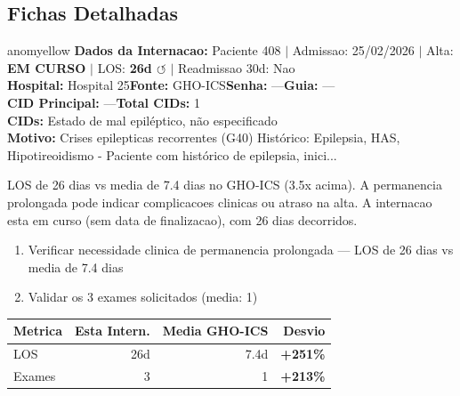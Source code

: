 \documentclass[a4paper,10pt]{article}
\begin{document}
\subsection{Fichas Detalhadas}
\begin{anomalycard}[Internacao 342 | GHO-ICS | MODERADO (z=2.78)]{anomyellow}
\textbf{Dados da Internacao:} Paciente 408 $\mid$ Admissao: 25/02/2026 $\mid$ Alta: \textcolor{anomorange}{\textbf{EM CURSO}} $\mid$ LOS: \textbf{26d \textcolor{anomorange}{$\circlearrowleft$}} $\mid$ Readmissao 30d: Nao\\
\textbf{Hospital:} Hospital 25\quad\textbf{Fonte:} GHO-ICS\quad\textbf{Senha:} ---\quad\textbf{Guia:} ---\\
\textbf{CID Principal:} {\small ---}\quad\textbf{Total CIDs:} 1\\

\textbf{CIDs:} {\scriptsize Estado de mal epiléptico, não especificado}\\

\textbf{Motivo:} {\scriptsize Crises epilepticas recorrentes (G40)  Histórico: Epilepsia, HAS, Hipotireoidismo  - Paciente com histórico de epilepsia, inici...}\\

\vspace{2pt}\begin{tcolorbox}[colback=severityred!20,colframe=anomyellow,title={\textbf{Interpretacao de Negocio}},fonttitle=\bfseries\small,left=4pt,right=4pt,top=3pt,bottom=3pt]
{\small LOS de 26 dias vs media de 7.4 dias no GHO-ICS (3.5x acima). A permanencia prolongada pode indicar complicacoes clinicas ou atraso na alta. A internacao esta em curso (sem data de finalizacao), com 26 dias decorridos.}
\end{tcolorbox}
\begin{tcolorbox}[colback=severityyellow!30,colframe=anomorange,title={\textbf{Recomendacoes Especificas}},fonttitle=\bfseries\small,left=4pt,right=4pt,top=3pt,bottom=3pt]
\begin{enumerate}[nosep,leftmargin=16pt]
\item {\small Verificar necessidade clinica de permanencia prolongada --- LOS de 26 dias vs media de 7.4 dias}
\item {\small Validar os 3 exames solicitados (media: 1)}
\end{enumerate}
\end{tcolorbox}
\begin{center}\begin{tabular}{l r r r}\toprule\textbf{Metrica} & \textbf{Esta Intern.} & \textbf{Media GHO-ICS} & \textbf{Desvio} \\\midrule
LOS & 26d & 7.4d & \textcolor{anomred}{\textbf{+251\%}} \\
Exames & 3 & 1 & \textcolor{anomred}{\textbf{+213\%}} \\
\bottomrule\end{tabular}\end{center}


\end{anomalycard}
\end{document}
